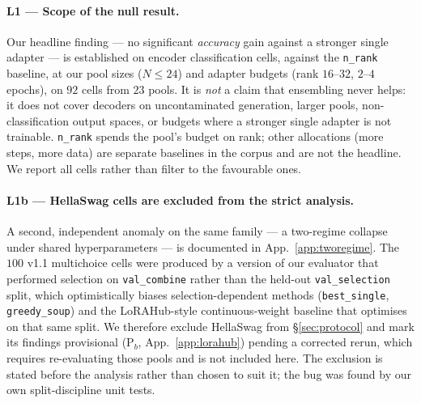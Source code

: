 \documentclass[11pt]{article}
\begin{document}
\paragraph{L1 — Scope of the null result.} Our headline finding --- no significant \emph{accuracy} gain against a stronger single adapter --- is established on encoder classification cells, against the \texttt{n\_rank} baseline, at our pool sizes ($N{\leq}24$) and adapter budgets (rank $16$--$32$, $2$--$4$ epochs), on $92$ cells from $23$ pools. It is \emph{not} a claim that ensembling never helps: it does not cover decoders on uncontaminated generation, larger pools, non-classification output spaces, or budgets where a stronger single adapter is not trainable. \texttt{n\_rank} spends the pool's budget on rank; other allocations (more steps, more data) are separate baselines in the corpus and are not the headline. We report all cells rather than filter to the favourable ones.

\paragraph{L1b — HellaSwag cells are excluded from the strict analysis.} A second, independent anomaly on the same family --- a two-regime collapse under shared hyperparameters --- is documented in App.~\ref{app:tworegime}. The $100$ v1.1 multichoice cells were produced by a version of our evaluator that performed selection on \texttt{val\_combine} rather than the held-out \texttt{val\_selection} split, which optimistically biases selection-dependent methods (\texttt{best\_single}, \texttt{greedy\_soup}) and the LoRAHub-style continuous-weight baseline that optimises on that same split. We therefore exclude HellaSwag from \S\ref{sec:protocol} and mark its findings provisional (P$_b$, App.~\ref{app:lorahub}) pending a corrected rerun, which requires re-evaluating those pools and is not included here. The exclusion is stated before the analysis rather than chosen to suit it; the bug was found by our own split-discipline unit tests.
\end{document}
